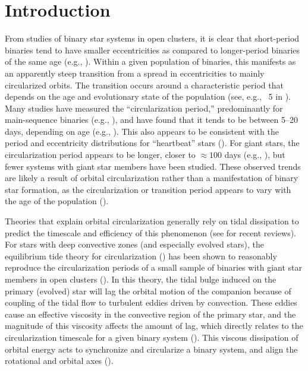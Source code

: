 \documentclass[modern, letterpaper]{aastex62}
\begin{document}

\section{Introduction} \label{sec:intro}

From studies of binary star systems in open clusters, it is clear that
short-period binaries tend to have smaller eccentricities as compared to
longer-period binaries of the same age (e.g., \citealt{Mathieu:2005}).
Within a given population of binaries, this manifests as an apparently steep
transition from a spread in eccentricities to mainly circularized orbits.
The transition occurs around a characteristic period that depends on the age and
evolutionary state of the population (see, e.g., \figurename~5 in
\citealt{Mathieu:2005}).
Many studies have measured the ``circularization period,'' predominantly for
main-sequence binaries (e.g., \citealt{Latham:2002, Meibom:2006,
Kjurkchieva:2017}), and have found that it tends to be between 5--20 days,
depending on age (e.g., \citealt{Mathieu:1988}).
This also appears to be consistent with the period and eccentricity
distributions for ``heartbeat'' stars (\citealt{Shporer:2016}).
For giant stars, the circularization period appears to be longer, closer to
$\approx 100$ days (e.g., \citealt{Mayor:1984, Bluhm:2016}), but fewer systems
with giant star members have been studied.
These observed trends are likely a result of orbital circularization rather than
a manifestation of binary star formation, as the circularization or transition
period appears to vary with the age of the population (\citealt{Meibom:2005}).

Theories that explain orbital circularization generally rely on tidal
dissipation to predict the timescale and efficiency of this phenomenon (see
\citealt{Mazeh:2007hp, Zahn:2008} for recent reviews).
For stars with deep convective zones (and especially evolved stars), the
equilibrium tide theory for circularization (\citealt{Zahn:1977, Zahn:1989}) has
been shown to reasonably reproduce the circularization periods of a small sample
of binaries with giant star members in open clusters (\citealt{Verbunt:1995}).
In this theory, the tidal bulge induced on the primary (evolved) star will lag
the orbital motion of the companion because of coupling of the tidal flow to
turbulent eddies driven by convection.
These eddies cause an effective viscosity in the convective region of the
primary star, and the magnitude of this viscosity affects the amount of lag,
which directly relates to the circularization timescale for a given binary
system (\citealt{Zahn:1989}).
This viscous dissipation of orbital energy acts to synchronize and circularize a
binary system, and align the rotational and orbital axes (\citealt{Zahn:1977,
Zahn:1989}).
\end{document}
